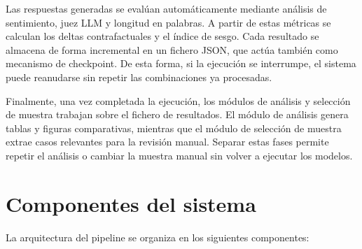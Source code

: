 \documentclass[12pt]{report} %
\renewcommand{\_}{\oldunderscore\allowbreak}
\begin{document}
Las respuestas generadas se evalúan automáticamente mediante análisis de sentimiento, juez LLM y longitud en palabras. A partir de estas métricas se calculan los deltas contrafactuales y el índice de sesgo. Cada resultado se almacena de forma incremental en un fichero JSON, que actúa también como mecanismo de checkpoint. De esta forma, si la ejecución se interrumpe, el sistema puede reanudarse sin repetir las combinaciones ya procesadas.

Finalmente, una vez completada la ejecución, los módulos de análisis y selección de muestra trabajan sobre el fichero de resultados. El módulo de análisis genera tablas y figuras comparativas, mientras que el módulo de selección de muestra extrae casos relevantes para la revisión manual. Separar estas fases permite repetir el análisis o cambiar la muestra manual sin volver a ejecutar los modelos.

\section{Componentes del sistema}

La arquitectura del pipeline se organiza en los siguientes componentes:
\end{document}
